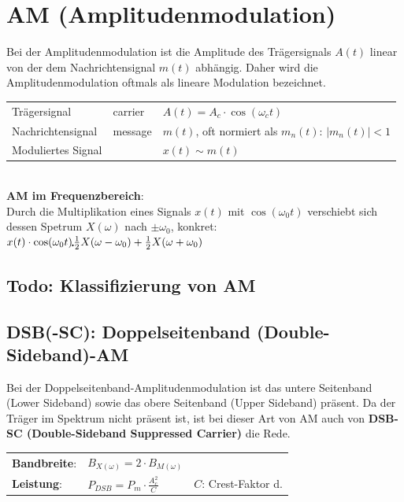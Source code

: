 \section{AM (Amplitudenmodulation) }
	Bei der Amplitudenmodulation ist die Amplitude des Trägersignals $A(t)$ linear von der dem Nachrichtensignal $m(t)$ abhängig. Daher wird die Amplitudenmodulation oftmals als lineare Modulation bezeichnet.\\ 
	\begin{tabular}{l l l}
		Trägersignal & carrier & $A(t)=A_c \cdot \cos(\omega_c t)$ \\
		Nachrichtensignal & message & $m(t)$, oft normiert als $m_n(t)$: $|m_n(t)| < 1$  \\
		Moduliertes Signal & & $ x(t) \sim m(t) $ \\
	\end{tabular}\\
	
	\textbf{AM im Frequenzbereich}:\\
	Durch die Multiplikation eines Signals $x(t)$ mit $\cos(\omega_0 t)$ verschiebt sich dessen Spetrum $X(\omega)$ nach $\pm \omega_0$, konkret:\\
		$x(t) \cdot \cos(\omega_0 t) \FT \frac{1}{2} X(\omega - \omega_0) + \frac{1}{2} X(\omega + \omega_0) $

	\subsection{Todo: Klassifizierung von AM}

\subsection{DSB(-SC): Doppelseitenband (Double-Sideband)-AM }
	Bei der Doppelseitenband-Amplitudenmodulation ist das untere Seitenband (Lower Sideband) sowie das obere Seitenband (Upper Sideband) präsent. Da der Träger im Spektrum nicht präsent ist, ist bei dieser Art von AM auch von \textbf{DSB-SC (Double-Sideband Suppressed Carrier)} die Rede. \\ 
	\begin{tabular}{l l l}
		\textbf{Bandbreite}: & $B_{X(\omega)} = 2 \cdot B_{M(\omega)}$ & \\
		\textbf{Leistung}: & $P_{DSB} = P_m \cdot \frac{A_c^2}{C}$ & $C$: Crest-Faktor d. \\
	\end{tabular}

